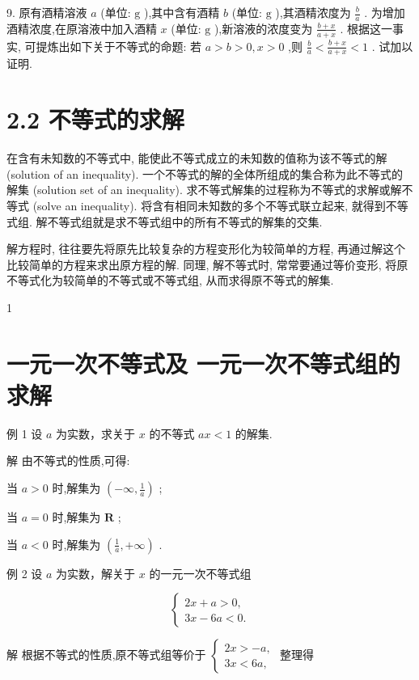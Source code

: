 \documentclass[10pt]{article}
\begin{document}
9. 原有酒精溶液 \(a\) (单位: \(\mathrm{g}\) ),其中含有酒精 \(b\) (单位: \(\mathrm{g}\) ),其酒精浓度为 \(\frac{b}{a}\) . 为增加酒精浓度,在原溶液中加入酒精 \(x\) (单位: \(\mathrm{g}\) ),新溶液的浓度变为 \(\frac{b + x}{a + x}\) . 根据这一事实, 可提炼出如下关于不等式的命题: 若 \(a > b > 0,x > 0\) ,则 \(\frac{b}{a} < \frac{b + x}{a + x} < 1\) . 试加以证明.



\section*{2.2 不等式的求解}

在含有未知数的不等式中, 能使此不等式成立的未知数的值称为该不等式的解 (solution of an inequality). 一个不等式的解的全体所组成的集合称为此不等式的解集 (solution set of an inequality). 求不等式解集的过程称为不等式的求解或解不等式 (solve an inequality). 将含有相同未知数的多个不等式联立起来, 就得到不等式组. 解不等式组就是求不等式组中的所有不等式的解集的交集.

解方程时, 往往要先将原先比较复杂的方程变形化为较简单的方程, 再通过解这个比较简单的方程来求出原方程的解. 同理, 解不等式时, 常常要通过等价变形, 将原不等式化为较简单的不等式或不等式组, 从而求得原不等式的解集.

1

\section*{一元一次不等式及 一元一次不等式组的求解}

例 1 设 \(a\) 为实数，求关于 \(x\) 的不等式 \({ax} < 1\) 的解集.

解 由不等式的性质,可得:

当 \(a > 0\) 时,解集为 \(\left( {-\infty ,\frac{1}{a}}\right)\) ;

当 \(a = 0\) 时,解集为 \(\mathbf{R}\) ;

当 \(a < 0\) 时,解集为 \(\left( {\frac{1}{a}, + \infty }\right)\) .

例 2 设 \(a\) 为实数，解关于 \(x\) 的一元一次不等式组

\[
\left\{  \begin{array}{l} {2x} + a > 0, \\  {3x} - {6a} < 0. \end{array}\right.
\]

解 根据不等式的性质,原不等式组等价于 \(\left\{  \begin{array}{l} {2x} >  - a, \\  {3x} < {6a}, \end{array}\right.\) 整理得
\end{document}
